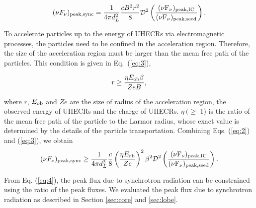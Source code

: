 \documentclass{aastex6}
\begin{document}
\begin{equation}
(\nu F_{\nu})_{\rm{peak,sync}} = \frac{1}{4\pi d^{2}_{L}}\frac{cB^{2}r^{2}}{8}\cal{D}\rm^{2}\left(\frac{(\nu F_{\nu})_{\rm{peak,IC}}}{(\nu F_{\nu})_{\rm{peak,seed}}}\right).
\label{eq:2}
\end{equation}

To accelerate particles up to the energy of UHECRs via electromagnetic processes, the particles need to be confined in the acceleration region.
Therefore, the size of the acceleration region must be larger than the mean free path of the particles.
This condition is given in Eq.~(\ref{eq:3}),

\begin{equation}
r \geq \frac{\eta E_{\rm{ob}}\beta}{ZeB},
\label{eq:3}
\end{equation}

\noindent where $r$, $E_{\rm{ob}}$ and $Ze$ are the size of radius of the acceleration region, the observed energy of UHECRs and the charge of UHECRs.
$\eta~(\geq$ 1) is the ratio of the mean free path of the particle to the Larmor radius, whose exact value is determined by the details of the particle transportation.
Combining Eqs. (\ref{eq:2}) and (\ref{eq:3}), we obtain
\begin{equation}
(\nu F_{\nu})_{\rm{peak,sync}} \geq \frac{1}{4\pi d^{2}_{L}}\frac{c}{8}\left(\frac{\eta E_{\rm{ob}}}{Ze}\right)^{2}\beta^{2}\cal{D}\rm^{2}\left(\frac{(\nu F_{\nu})_{\rm{peak,IC}}}{(\nu F_{\nu})_{\rm{peak,seed}}}\right).
\label{eq:4}
\end{equation}

From Eq. (\ref{eq:4}), the peak flux due to synchrotron radiation can be constrained using the ratio of the peak fluxes.
We evaluated the peak flux due to synchrotron radiation as described in Section \ref{sec:core} and \ref{sec:lobe}.

\end{document}
